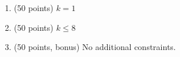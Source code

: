 \begin{enumerate}
    \tightlist
    \item (50 points) $k = 1$
    \item (50 points) $k \leq 8$
    \item (50 points, bonus) No additional constraints.
\end{enumerate}
    